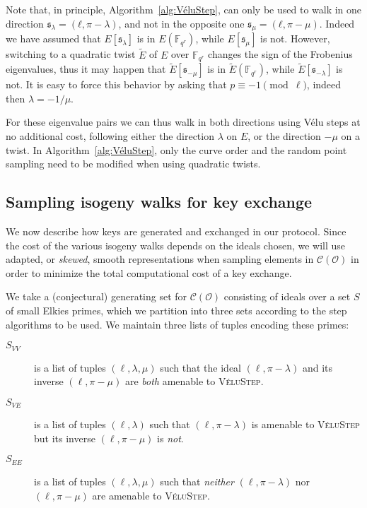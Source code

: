 \documentclass{llncs}
\newcommand{\F}{\mathbb{F}}
\newcommand{\Cl}{\mathcal{C}}
\renewcommand{\O}{\mathcal{O}}
\newcommand{\algstyle}[1]{\textsc{#1}}
\renewcommand{\frak}{\mathfrak}
\begin{document}
\begin{remark}
    \label{rem:twist-trick}
    Note that, in principle, Algorithm~\ref{alg:VéluStep}, can only be
    used to walk in one direction $\frak s_λ=(ℓ,π-λ)$, and not in the
    opposite one $\frak s_μ=(ℓ,π-μ)$. Indeed we have assumed that
    $E[\frak s_λ]$ is in $E(\F_{q^r})$, while $E[\frak s_μ]$ is not.
    However, switching to a quadratic twist $\tilde{E}$ of $E$ over
    $\F_{q^r}$ changes the sign of the Frobenius eigenvalues, thus it
    may happen that $\tilde{E}[\frak s_{-μ}]$ is in
    $\tilde{E}(\F_{q^r})$, while $\tilde{E}[\frak s_{-λ}]$ is not. It
    is easy to force this behavior by asking that
    $p \equiv -1\pmod{\ell}$, indeed then $\lambda = -1/μ$.

    For these eigenvalue pairs we can thus walk in both directions
    using Vélu steps at no additional cost, following either the
    direction $λ$ on $E$, or the direction $-μ$ on a twist. In
    Algorithm~\ref{alg:VéluStep}, only the curve order and the random
    point sampling need to be modified when using quadratic twists.
\end{remark}

\subsection{Sampling isogeny walks for key exchange}

We now describe how keys are generated and exchanged in our protocol. 
Since the cost of the various isogeny walks depends on the ideals
chosen,
we will use adapted, or \emph{skewed}, 
smooth representations when sampling elements in $\Cl(\O)$
in order to minimize the total computational cost of a key exchange.

We take a (conjectural) generating set for $\Cl(\O)$ consisting of ideals over a set 
$S$ of small Elkies primes,
which we partition into three sets according to the step algorithms to be used.
We maintain three lists of tuples encoding these primes:

\begin{description}
    \item[$S_{VV}$]
        \label{case:velustep-sym}
        is a list of tuples $(\ell,\lambda,\mu)$
        such that the ideal $(\ell,\pi - \lambda)$ 
        and its inverse $(\ell,\pi-\mu)$
        are \emph{both} amenable to \algstyle{VéluStep}.
    \item[$S_{VE}$]
        \label{case:velustep-asym}
        is a list of tuples $(\ell,\lambda)$
        such that $(\ell,\pi-\lambda)$ is amenable to
        \algstyle{VéluStep} but its inverse $(\ell,\pi-\mu)$ is \emph{not}.
    \item[$S_{EE}$]
        \label{case:elkstep} 
        is a list of tuples $(\ell,\lambda,\mu)$
        such that \emph{neither} $(\ell,\pi - \lambda)$ nor $(\ell,\pi-\mu)$
        are amenable to \algstyle{VéluStep}.
\end{description}
\end{document}
